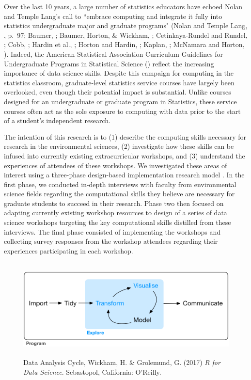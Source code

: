 \documentclass[12pt]{article}
\begin{document}
\quad Over the last 10 years, a large number of statistics educators have echoed
Nolan and Temple Lang's call to ``embrace computing and integrate it fully into 
statistics undergraduate major and graduate programs" (Nolan and Temple Lang, 
\citeyear{nolan}, p.\ 97; Baumer, \citeyear{baumer_datascience}; Baumer, Horton, 
\& Wickham, \citeyear{horton_takingachance}; Cetinkaya-Rundel and Rundel, 
\citeyear{mine}; Cobb, \citeyear{cobb}; Hardin et al., \citeyear{hardin}; Horton
and Hardin, \citeyear{horton_thinkwithdata}; Kaplan, \citeyear{kaplan}; McNamara
and Horton, \citeyear{mcnamara}). Indeed, the American Statistical Association 
Curriculum Guidelines for Undergraduate Programs in Statistical Science 
(\citeyear{asa}) reflect the increasing importance of data science skills.
Despite this campaign for computing in the statistics classroom, graduate-level 
statistics service courses have largely been overlooked, even though their 
potential impact is substantial. Unlike courses designed for an undergraduate or
graduate program in Statistics, these service courses often act as the sole 
exposure to computing with data prior to the start of a student's independent 
research. 

\quad The intention of this research is to (1) describe the computing skills 
necessary for research in the environmental sciences, (2) investigate how these 
skills can be infused into currently existing extracurricular workshops, and (3)
understand the experiences of attendees of these workshops. We investigated 
these areas of interest using a three-phase design-based implementation
research model \citep{penuel}. In the first phase, we conducted in-depth
interviews with faculty from environmental science fields regarding the
computational skills they believe are necessary for graduate students to succeed
in their research. Phase two then focused on adapting currently existing
workshop resources to design of a series of data science workshops targeting the
key computational skills distilled from these interviews. The final phase
consisted of implementing the workshops and collecting survey responses from the
workshop attendees regarding their experiences participating in each workshop.  

\begin{figure}[h!]
    \centering
    \includegraphics[width = \textwidth, height = 2in]{images/data-science-explore.png}
    \caption{Data Analysis Cycle, Wickham, H. \& Grolemund, G. (2017) \emph{R 
    for Data Science}. Sebastopol, California: O'Reilly.}
\label{fig:cycle}
\end{figure}
\end{document}
